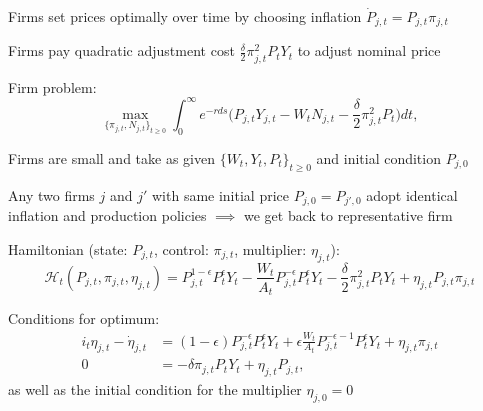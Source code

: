 \documentclass[11pt, aspectratio=169]{beamer}
\newenvironment{witemize}{\itemize\addtolength{\itemsep}{10pt}}{\enditemize}
\begin{document}
\begin{frame}{}
\begin{witemize}
\item Firms set prices optimally over time by choosing inflation $\dot P_{j, t} = P_{j, t} \pi_{j, t}$
\item Firms pay quadratic adjustment cost $\frac{\delta}{2} \pi_{j, t}^2 P_t Y_t$ to adjust nominal price

\item Firm problem:
\begin{equation*}
	\max_{ \{ \pi_{j, t}, N_{j, t} \}_{t \geq 0} } \int_0^\infty e^{- r ds} \bigg( P_{j, t} Y_{j, t} - W_t N_{j, t} - \frac{\delta}{2} \pi_{j, t}^2 P_t \bigg) dt,
\end{equation*}

\item Firms are small and take as given $\{ W_t, Y_t, P_t \}_{t \geq 0}$ and initial condition $P_{j, 0}$

\item Any two firms $j$ and $j'$ with same initial price $P_{j, 0} = P_{j', 0}$ adopt identical inflation and production policies $\implies$ we get back to representative firm

\end{witemize}
\end{frame}


\begin{frame}{}
\begin{witemize}
\item Hamiltonian (state: $P_{j, t}$, control: $\pi_{j, t}$, multiplier: $\eta_{j, t}$):
\begin{equation*}
	\mathcal H_t(P_{j, t}, \pi_{j, t}, \eta_{j, t}) = P_{j, t}^{1-\epsilon} P_t^{\epsilon} Y_t - \frac{W_t}{A_t} P_{j, t}^{-\epsilon} P_t^{\epsilon} Y_t  - \frac{\delta}{2} \pi_{j, t}^2 P_t Y_t + \eta_{j, t} P_{j, t} \pi_{j, t}
\end{equation*}

\item Conditions for optimum:
\begin{align*}
	i_t \eta_{j, t} - \dot \eta_{j, t} &= (1-\epsilon) P_{j, t}^{-\epsilon} P_t^{\epsilon} Y_t + \epsilon \frac{W_t}{A_t} P_{j, t}^{-\epsilon - 1} P_t^{\epsilon} Y_t + \eta_{j, t} \pi_{j, t}  \\
	0 &= - \delta \pi_{j, t} P_t Y_t + \eta_{j, t} P_{j, t},
\end{align*}
as well as the initial condition for the multiplier $\eta_{j, 0} = 0$

\end{witemize}
\end{frame}
\end{document}
